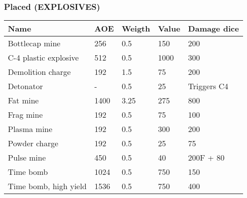 
\subsubsection{Placed (EXPLOSIVES)}
\begin{longtable}{|p{4cm}|p{1.5cm}|p{1.5cm}|p{2cm}|p{4cm}|}
\hline
\bfseries Name & \bfseries AOE & \bfseries Weigth & \bfseries Value & \bfseries Damage dice \\
\hline
\endhead
Bottlecap mine  & 256 & 0.5  & 150 & 200 \\
C-4 plastic explosive  & 512 & 0.5  & 1000 & 300 \\
Demolition charge  & 192 & 1.5  & 75 & 200 \\
Detonator  & -  & 0.5  & 25 & Triggers C4 \\
Fat mine  & 1400 & 3.25  & 275 & 800 \\
Frag mine  & 192 & 0.5  & 75 & 100 \\
Plasma mine  & 192 & 0.5  & 300 & 200 \\
Powder charge  & 192 & 0.5  & 25 & 75 \\
Pulse mine  & 450 & 0.5  & 40 & 200F + 80 \\
Time bomb  & 1024 & 0.5  & 750 & 150 \\
Time bomb, high yield  & 1536 & 0.5  & 750 & 400 \\
\hline
\end{longtable}

